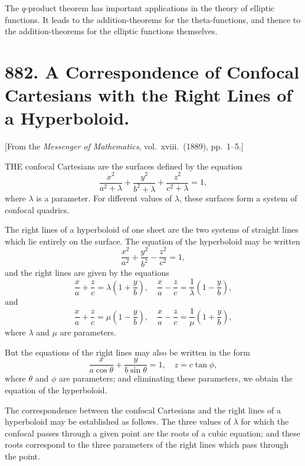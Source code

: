 \documentclass[12pt,a4paper]{article}
\theoremstyle{plain}
\begin{document}
\medskip\noindent
The $q$-product theorem has important applications in the theory of elliptic functions. It leads to the addition-theorems for the theta-functions, and thence to the addition-theorems for the elliptic functions themselves.

\newpage
\section[882]{882. A Correspondence of Confocal Cartesians with the Right Lines of a Hyperboloid.}
\label{sec:882}

[From the \textit{Messenger of Mathematics}, vol.\ xviii.\ (1889), pp.\ 1--5.]

\medskip\noindent
THE confocal Cartesians are the surfaces defined by the equation
\[
\frac{x^{2}}{a^{2} + \lambda} + \frac{y^{2}}{b^{2} + \lambda} + \frac{z^{2}}{c^{2} + \lambda} = 1,
\]
where $\lambda$ is a parameter. For different values of $\lambda$, these surfaces form a system of confocal quadrics.

\medskip\noindent
The right lines of a hyperboloid of one sheet are the two systems of straight lines which lie entirely on the surface. The equation of the hyperboloid may be written
\[
\frac{x^{2}}{a^{2}} + \frac{y^{2}}{b^{2}} - \frac{z^{2}}{c^{2}} = 1,
\]
and the right lines are given by the equations
\[
\frac{x}{a} + \frac{z}{c} = \lambda\left(1 + \frac{y}{b}\right), \quad
\frac{x}{a} - \frac{z}{c} = \frac{1}{\lambda}\left(1 - \frac{y}{b}\right),
\]
and
\[
\frac{x}{a} + \frac{z}{c} = \mu\left(1 - \frac{y}{b}\right), \quad
\frac{x}{a} - \frac{z}{c} = \frac{1}{\mu}\left(1 + \frac{y}{b}\right),
\]
where $\lambda$ and $\mu$ are parameters.

\medskip\noindent
But the equations of the right lines may also be written in the form
\[
\frac{x}{a\cos\theta} + \frac{y}{b\sin\theta} = 1, \quad z = c\tan\phi,
\]
where $\theta$ and $\phi$ are parameters; and eliminating these parameters, we obtain the equation of the hyperboloid.

\medskip\noindent
The correspondence between the confocal Cartesians and the right lines of a hyperboloid may be established as follows. The three values of $\lambda$ for which the confocal passes through a given point are the roots of a cubic equation; and these roots correspond to the three parameters of the right lines which pass through the point.
\end{document}
